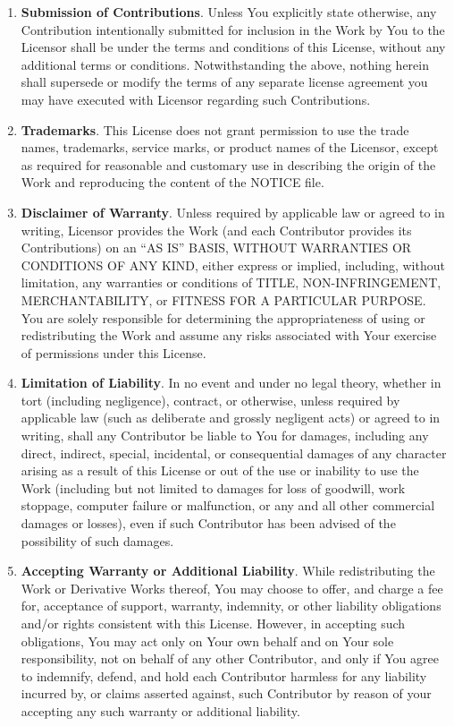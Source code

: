 \documentclass{pracamgr}
\begin{document}
\begin{enumerate}
\item \textbf{Submission of Contributions}. Unless You explicitly
  state otherwise, any Contribution intentionally submitted for
  inclusion in the Work by You to the Licensor shall be under the
  terms and conditions of this License, without any additional terms
  or conditions.  Notwithstanding the above, nothing herein shall
  supersede or modify the terms of any separate license agreement you
  may have executed with Licensor regarding such Contributions.

\item \textbf{Trademarks}. This License does not grant permission to
  use the trade names, trademarks, service marks, or product names of
  the Licensor, except as required for reasonable and customary use in
  describing the origin of the Work and reproducing the content of the
  NOTICE file.

\item \textbf{Disclaimer of Warranty}. Unless required by applicable
  law or agreed to in writing, Licensor provides the Work (and each
  Contributor provides its Contributions) on an ``AS IS'' BASIS, WITHOUT
  WARRANTIES OR CONDITIONS OF ANY KIND, either express or implied,
  including, without limitation, any warranties or conditions of
  TITLE, NON-INFRINGEMENT, MERCHANTABILITY, or FITNESS FOR A
  PARTICULAR PURPOSE. You are solely responsible for determining the
  appropriateness of using or redistributing the Work and assume any
  risks associated with Your exercise of permissions under this
  License.

\item \textbf{Limitation of Liability}. In no event and under no legal
  theory, whether in tort (including negligence), contract, or
  otherwise, unless required by applicable law (such as deliberate and
  grossly negligent acts) or agreed to in writing, shall any
  Contributor be liable to You for damages, including any direct,
  indirect, special, incidental, or consequential damages of any
  character arising as a result of this License or out of the use or
  inability to use the Work (including but not limited to damages for
  loss of goodwill, work stoppage, computer failure or malfunction, or
  any and all other commercial damages or losses), even if such
  Contributor has been advised of the possibility of such damages.

\item \textbf{Accepting Warranty or Additional Liability}. While
  redistributing the Work or Derivative Works thereof, You may choose
  to offer, and charge a fee for, acceptance of support, warranty,
  indemnity, or other liability obligations and/or rights consistent
  with this License. However, in accepting such obligations, You may
  act only on Your own behalf and on Your sole responsibility, not on
  behalf of any other Contributor, and only if You agree to indemnify,
  defend, and hold each Contributor harmless for any liability
  incurred by, or claims asserted against, such Contributor by reason
  of your accepting any such warranty or additional liability.

\end{enumerate}
\end{document}
